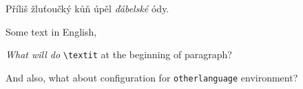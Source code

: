 \documentclass{article}
\begin{document}
Příliš žluťoučký kůň úpěl \textit{ďábelské} ódy.
\begin{otherlanguage}{english}
    Some text in English, \hello
\end{otherlanguage}

\begin{otherlanguage}{english}

    \textit{What will do} \verb|\textit| at the beginning of paragraph?

    And also, what about configuration for \verb|otherlanguage| environment?

\end{otherlanguage}
\end{document}
